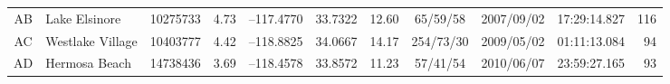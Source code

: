 \begin{table*}
\begin{tabular}[t]{@{} c l r c r@{, }l r c c c r}
		AB	& Lake Elsinore			&	10275733	&	4.73	&	--117.4770	&	33.7322	&	12.60	&	 65/59/58	&	2007/09/02	&	17:29:14.827	&	116	\\ %
																					
		AC	& Westlake Village		&	10403777	&	4.42	&	--118.8825	&	34.0667	&	14.17	&	254/73/30	&	2009/05/02	&	01:11:13.084	&	94	\\ %
																					
		AD	& Hermosa Beach			&	14738436	&	3.69	&	--118.4578	&	33.8572	&	11.23	&	 57/41/54	&	2010/06/07	&	23:59:27.165	&	93	\\ %
	\hline
	\end{tabular}
	\label{tab:events}
\end{table*}


